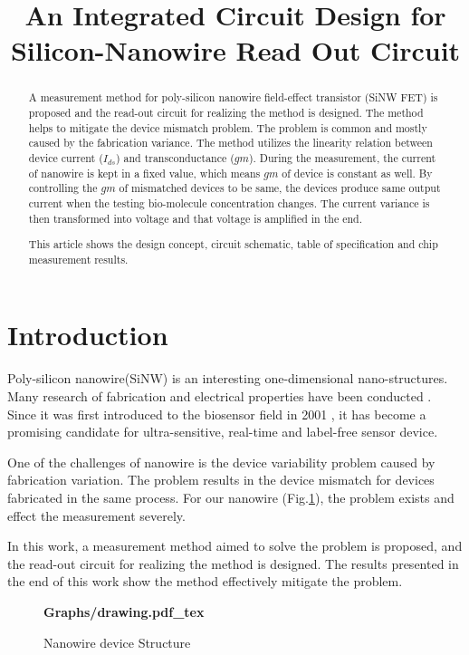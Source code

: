 \documentclass{article}
\title{An Integrated Circuit Design for Silicon-Nanowire Read Out Circuit}
\begin{document}
%
\maketitle
%
\begin{abstract}
A measurement method for poly-silicon nanowire field-effect transistor (SiNW FET) is proposed and the read-out circuit for realizing the method is designed.
The method helps to mitigate the device mismatch problem.
The problem is common and mostly caused by the fabrication variance.
The method utilizes the linearity relation between device current ($I_{ds}$) and transconductance ($gm$).
During the measurement, the current of nanowire is kept in a fixed value, which means $gm$ of device is constant as well.
By controlling the $gm$ of mismatched devices to be same, the devices produce same output current when the testing bio-molecule concentration changes.
The current variance is then transformed into voltage and that voltage is amplified in the end.

This article shows the design concept, circuit schematic, table of specification and chip measurement results.
\end{abstract}
%
\section{Introduction}
\label{sec:intro}

Poly-silicon nanowire(SiNW) is an interesting one-dimensional nano-structures.
Many research of fabrication and electrical properties have been conducted \cite{C25th}.
Since it was first introduced to the biosensor field in 2001 \cite{C2001}, it has become a promising candidate for ultra-sensitive, real-time and label-free sensor device.

One of the challenges of nanowire is the device variability problem caused by fabrication variation.
The problem results in the device mismatch for devices fabricated in the same process.
For our nanowire (Fig.\ref{fig:draw}), the problem exists and effect the measurement severely.

In this work, a measurement method aimed to solve the problem is proposed, and the read-out circuit for realizing the method is designed.
The results presented in the end of this work show the method effectively mitigate the problem.


\begin{figure}[hbt]
    \centering
    {\selectfont\textbf{
        \def\svgwidth{5.0cm}
        \fontsize{6}{7}\selectfont
         {Graphs/drawing.pdf_tex}
    }}
    \caption{Nanowire device Structure}
    \label{fig:draw}
\end{figure}
\end{document}
